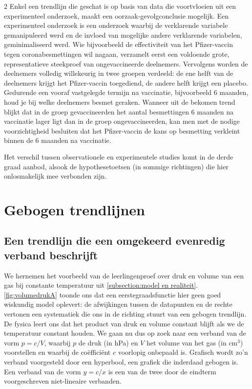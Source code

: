 \begin{multicols}{2}
Enkel een trendlijn die geschat is op basis van data die voortvloeien uit een experimenteel onderzoek, maakt een oorzaak-gevolgconclusie mogelijk. Een experimenteel onderzoek is een onderzoek waarbij de verklarende variabele gemanipuleerd werd en de invloed van mogelijke andere verklarende variabelen, geminimaliseerd werd. Wie bijvoorbeeld de effectiviteit van het Pfizer-vaccin tegen coronabesmettingen wil nagaan, verzamelt eerst een voldoende grote, representatieve steekproef van ongevaccineerde deelnemers. Vervolgens worden de deelnemers volledig willekeurig in twee groepen verdeeld: de ene helft van de deelnemers krijgt het Pfizer-vaccin toegediend, de andere helft krijgt een placebo. Gedurende een vooraf vastgelegde termijn na vaccinatie, bijvoorbeeld 6 maanden, houd je bij welke deelnemers besmet geraken. Wanneer uit de bekomen trend blijkt dat in de groep gevaccineerden het aantal besmettingen 6 maanden na vaccinatie lager ligt dan in de groep ongevaccineerden, kan men met de nodige voorzichtigheid besluiten dat het Pfizer-vaccin de kans op besmetting verkleint binnen de 6 maanden na vaccinatie.

Het verschil tussen observationele en experimentele studies komt in de derde graad aanbod, alsook de hypothesetoetsen (in sommige richtingen) die hier onlosmakelijk mee verbonden zijn.
\section{Gebogen trendlijnen}

\subsection{Een trendlijn die een omgekeerd evenredig verband beschrijft}

We hernemen het voorbeeld van de leerlingenproef over druk en volume van een gas bij constante temperatuur uit \autoref{subsection:model en realiteit}. \autoref{fig:volumedrukA}  toonde ons dat een eerstegraadsfunctie hier geen goed wiskundig model oplevert: de afwijkingen tussen de datapunten en de rechte vertonen een systematiek die ons in de richting stuurt van een gebogen trendlijn. De fysica leert ons dat het product van druk en volume constant blijft als we de temperatuur constant houden. We gaan nu dus op zoek naar een verband van de vorm $p=c/V$, waarbij $p$ de druk (in hPa) en $V$ het volume van het gas (in $\mathrm{cm}^3$) voorstellen en waarbij de coëfficiënt $c$ voorlopig onbepaald is. Grafisch wordt zo’n verband voorgesteld door een hyperbool, een grafiek die inderdaad gebogen is. Een verband van de vorm $y=c/x$ is een van de twee door de eindterm voorgeschreven niet-lineaire verbanden.


\end{multicols}

